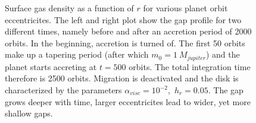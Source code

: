         \begin{figure}[h!]
          \begin{minipage}{.5\linewidth}
            \centering
          \end{minipage}%
          \begin{minipage}{.5\linewidth}
            \centering
          \end{minipage}
          \caption{
            Surface gas density as a function of $r$ for various planet orbit 
            eccentricites. The left and right plot show the gap profile
            for two different times, namely before and after an accretion
            period of 2000 orbits. In the beginning, accretion is turned of. 
            The first 50 orbits make up a tapering period 
            (after which $m_0=1\ M_{jupiter}$) and the planet starts accreting 
            at $t=500$ orbits. The total integration time therefore is 2500 
            orbits. Migration is deactivated and the disk is characterized by 
            the parameters $\alpha_{visc}=10^{-2}$,\ $h_r=0.05$.
            The gap grows deeper with time, larger eccentricites lead to wider,
            yet more shallow gaps.
          }
          \label{fig:gap_profile_vs_ecc_2500_orbits}
        \end{figure} \ \\

